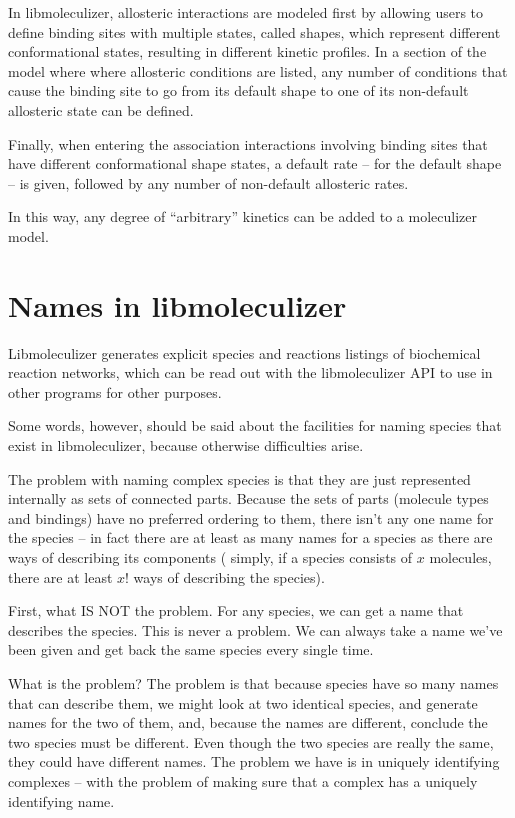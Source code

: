 In libmoleculizer, allosteric interactions are modeled first by
allowing users to define binding sites with multiple states, called
shapes, which represent different conformational states, resulting in
different kinetic profiles.  In a section of the model where where
allosteric conditions are listed, any number of conditions that cause
the binding site to go from its default shape to one of its
non-default allosteric state can be defined.

Finally, when entering the association interactions involving binding
sites that have different conformational shape states, a default rate
-- for the default shape -- is given, followed by any number of
non-default allosteric rates.

In this way, any degree of ``arbitrary'' kinetics can be added to a
moleculizer model.

\section{Names in libmoleculizer}

Libmoleculizer generates explicit species and reactions listings of
biochemical reaction networks, which can be read out with the
libmoleculizer API to use in other programs for other purposes.  

Some words, however, should be said about the facilities for naming
species that exist in libmoleculizer, because otherwise difficulties
arise.  

The problem with naming complex species is that they are just
represented internally as sets of connected parts.  Because the sets
of parts (molecule types and bindings) have no preferred ordering to
them, there isn't any one name for the species -- in fact there are at
least as many names for a species as there are ways of describing its
components ( simply, if a species consists of $x$ molecules, 
there are at least $x!$ ways of describing the species).  

First, what IS NOT the problem.  For any species, we can get a name
that describes the species.  This is never a problem.  We can always
take a name we've been given and get back the same species every
single time.

What is the problem?  The problem is that because species have so many
names that can describe them, we might look at two identical species,
and generate names for the two of them, and, because the names are
different, conclude the two species must be different.  Even though
the two species are really the same, they could have different names.
The problem we have is in uniquely identifying complexes -- with the
problem of making sure that a complex has a uniquely identifying
name.  


